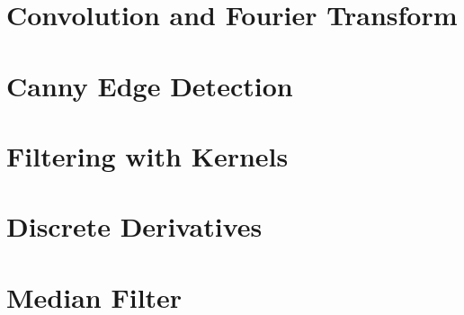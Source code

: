 \section{Convolution and Fourier Transform}

\section{Canny Edge Detection}

\section{Filtering with Kernels}

\section{Discrete Derivatives}

\section{Median Filter}
